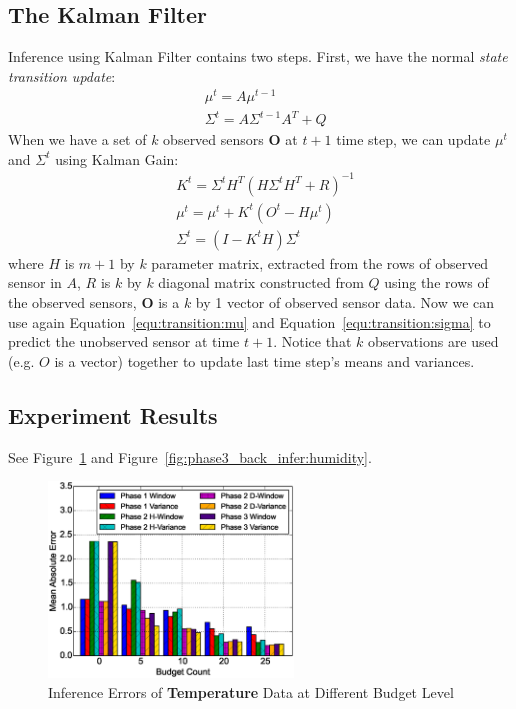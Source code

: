 \documentclass[12pt]{article}  %
\theoremstyle{definition}
\theoremstyle{remark}
\begin{document}
\subsection{The Kalman Filter}
Inference using Kalman Filter contains two steps.
First, we have the normal \textit{state transition update}:
\begin{align}
        & \mu^{t} = A \mu^{t-1} \label{equ:transition:mu} \\
        & \Sigma^{t} = A\Sigma^{t-1}A^T + Q\label{equ:transition:sigma}
\end{align}
When we have a set of $k$ observed sensors $\mathbf{O}$ at $t+1$ time step,
we can update $\mu^{t}$ and $\Sigma^{t}$ using Kalman Gain:
\begin{align}
        & K^t = \Sigma^t H^T (H\Sigma^{t}H^T + R)^{-1} \\
        & \mu^t = \mu^t + K^t(O^t - H\mu^t) \\
        & \Sigma^t = (I - K^t H)\Sigma^t 
\end{align}
where $H$ is $m+1$ by $k$ parameter matrix, extracted from the rows of observed sensor in $A$,
$R$ is $k$ by $k$ diagonal matrix constructed from $Q$ using the rows of the observed sensors,
$\mathbf{O}$ is a $k$ by 1 vector of observed sensor data.
Now we can use again Equation~\ref{equ:transition:mu} and Equation~\ref{equ:transition:sigma}
to predict the unobserved sensor at time $t+1$.
Notice that $k$ observations are used (e.g. $O$ is a vector)
together to update last time step's means and variances.


\subsection{Experiment Results}
See Figure~\ref{fig:phase3_back_infer:temperature} and Figure~\ref{fig:phase3_back_infer:humidity}.

\begin{figure}[H]
\centering
        \includegraphics[width=0.58\textwidth]{../phase3_backinfer/temperature_back_infer_err}
        \caption{Inference Errors of \textbf{Temperature} Data at Different Budget Level}
\label{fig:phase3_back_infer:temperature}
\end{figure}
\end{document}
